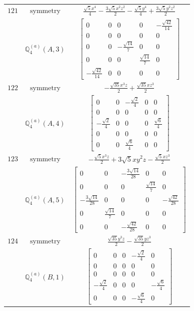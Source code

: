 \documentclass[fleqn,8pt,landscape]{jsarticle}
\begin{document}
\begin{longtable}{ccc}
$ 121 $ & $ \text{symmetry} $ & $ \frac{\sqrt{5} x^{4}}{4} - \frac{3 \sqrt{5} x^{2} z^{2}}{2} - \frac{\sqrt{5} y^{4}}{4} + \frac{3 \sqrt{5} y^{2} z^{2}}{2} $ \\
$  $ & $ \mathbb{Q}_{4}^{(a)}(A,3) $ & $ \begin{bmatrix} 0 & 0 & 0 & 0 & - \frac{\sqrt{42}}{14} \\ 0 & 0 & 0 & 0 & 0 \\ 0 & 0 & - \frac{\sqrt{14}}{7} & 0 & 0 \\ 0 & 0 & 0 & \frac{\sqrt{14}}{7} & 0 \\ - \frac{\sqrt{42}}{14} & 0 & 0 & 0 & 0 \end{bmatrix} $ \\ \hline
$ 122 $ & $ \text{symmetry} $ & $ - \frac{\sqrt{35} x^{3} z}{2} + \frac{\sqrt{35} x z^{3}}{2} $ \\
$  $ & $ \mathbb{Q}_{4}^{(a)}(A,4) $ & $ \begin{bmatrix} 0 & 0 & - \frac{\sqrt{2}}{4} & 0 & 0 \\ 0 & 0 & 0 & 0 & 0 \\ - \frac{\sqrt{2}}{4} & 0 & 0 & 0 & \frac{\sqrt{6}}{4} \\ 0 & 0 & 0 & 0 & 0 \\ 0 & 0 & \frac{\sqrt{6}}{4} & 0 & 0 \end{bmatrix} $ \\ \hline
$ 123 $ & $ \text{symmetry} $ & $ - \frac{\sqrt{5} x^{3} z}{2} + 3 \sqrt{5} x y^{2} z - \frac{\sqrt{5} x z^{3}}{2} $ \\
$  $ & $ \mathbb{Q}_{4}^{(a)}(A,5) $ & $ \begin{bmatrix} 0 & 0 & - \frac{3 \sqrt{14}}{28} & 0 & 0 \\ 0 & 0 & 0 & \frac{\sqrt{14}}{7} & 0 \\ - \frac{3 \sqrt{14}}{28} & 0 & 0 & 0 & - \frac{\sqrt{42}}{28} \\ 0 & \frac{\sqrt{14}}{7} & 0 & 0 & 0 \\ 0 & 0 & - \frac{\sqrt{42}}{28} & 0 & 0 \end{bmatrix} $ \\ \hline
$ 124 $ & $ \text{symmetry} $ & $ \frac{\sqrt{35} y^{3} z}{2} - \frac{\sqrt{35} y z^{3}}{2} $ \\
$  $ & $ \mathbb{Q}_{4}^{(a)}(B,1) $ & $ \begin{bmatrix} 0 & 0 & 0 & - \frac{\sqrt{2}}{4} & 0 \\ 0 & 0 & 0 & 0 & 0 \\ 0 & 0 & 0 & 0 & 0 \\ - \frac{\sqrt{2}}{4} & 0 & 0 & 0 & - \frac{\sqrt{6}}{4} \\ 0 & 0 & 0 & - \frac{\sqrt{6}}{4} & 0 \end{bmatrix} $ \\ \hline

\end{longtable}
\end{document}

